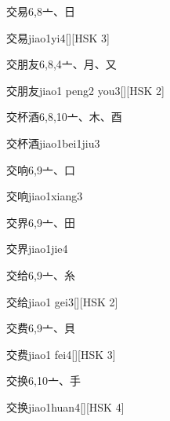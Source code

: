 \begin{entry}{交易}{6,8}{⼇、⽇}
  \begin{phonetics}{交易}{jiao1yi4}[][HSK 3]
  \end{phonetics}
\end{entry}

\begin{entry}{交朋友}{6,8,4}{⼇、⽉、⼜}
  \begin{phonetics}{交朋友}{jiao1 peng2 you3}[][HSK 2]
  \end{phonetics}
\end{entry}

\begin{entry}{交杯酒}{6,8,10}{⼇、⽊、⾣}
  \begin{phonetics}{交杯酒}{jiao1bei1jiu3}
  \end{phonetics}
\end{entry}

\begin{entry}{交响}{6,9}{⼇、⼝}
  \begin{phonetics}{交响}{jiao1xiang3}
  \end{phonetics}
\end{entry}

\begin{entry}{交界}{6,9}{⼇、⽥}
  \begin{phonetics}{交界}{jiao1jie4}
  \end{phonetics}
\end{entry}

\begin{entry}{交给}{6,9}{⼇、⽷}
  \begin{phonetics}{交给}{jiao1 gei3}[][HSK 2]
  \end{phonetics}
\end{entry}

\begin{entry}{交费}{6,9}{⼇、⾙}
  \begin{phonetics}{交费}{jiao1 fei4}[][HSK 3]
  \end{phonetics}
\end{entry}

\begin{entry}{交换}{6,10}{⼇、⼿}
  \begin{phonetics}{交换}{jiao1huan4}[][HSK 4]
  \end{phonetics}
\end{entry}


